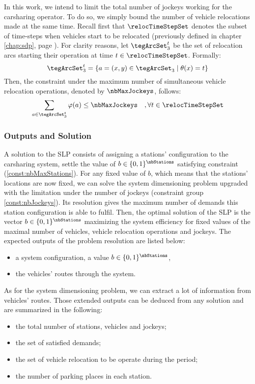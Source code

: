 \begin{bibunit}[ieeetr]
In this work, we intend to limit the total number of jockeys working for the carsharing operator.
To do so, we simply bound the number of vehicle relocations made at the same time.
Recall first that $\relocTimeStepSet$ denotes the subset of time-steps when vehicles start to be relocated (previously defined in chapter \ref{chap:sdp}, page \pageref{def:relocTimeStepSet}).
For clarity reasons, let $\tegArcSet_3^t$ be the set of relocation arcs starting their operation at time $t \in \relocTimeStepSet$.
Formally:
\begin{equation}
\tegArcSet_3^t = \{a = (x, y) \in \tegArcSet_3 \mid \theta(x) = t\}
\end{equation}
Then, the constraint under the maximum number of simultaneous vehicle relocation operations, denoted by $\nbMaxJockeys$, follows:
\begin{equation} \label{const:nbJockeys}
\sum_{a \in \tegArcSet_3^t} \varphi(a) \leq \nbMaxJockeys \quad, \forall t \in \relocTimeStepSet
\end{equation}


\subsubsection{Outputs and Solution}
A solution to the SLP consists of assigning a stations' configuration to the carsharing system, \ie settle the value of $b \in \{0, 1\}^\nbStations$ satisfying constraint (\ref{const:nbMaxStations}).
For any fixed value of $b$, which means that the stations' locations are now fixed, we can solve the system dimensioning problem upgraded with the limitation under the number of jockeys (constraint group \ref{const:nbJockeys}).
Its resolution gives the maximum number of demands this station configuration is able to fulfil.
Then, the optimal solution of the SLP is the vector $b \in \{0, 1\}^\nbStations$ maximizing the system efficiency for fixed values of the maximal number of vehicles, vehicle relocation operations and jockeys.
The expected outputs of the problem resolution are listed below:
\begin{itemize}
\item a system configuration, \ie a value $b \in \{0, 1\}^\nbStations$,
\item the vehicles' routes through the system.
\end{itemize}

\medskip
As for the system dimensioning problem, we can extract a lot of information from vehicles' routes.
Those extended outputs can be deduced from any solution and are summarized in the following:
\begin{itemize}
\item the total number of stations, vehicles and jockeys;
\item the set of satisfied demands;
\item the set of vehicle relocation to be operate during the period;
\item the number of parking places in each station.
\end{itemize}


\end{bibunit}
